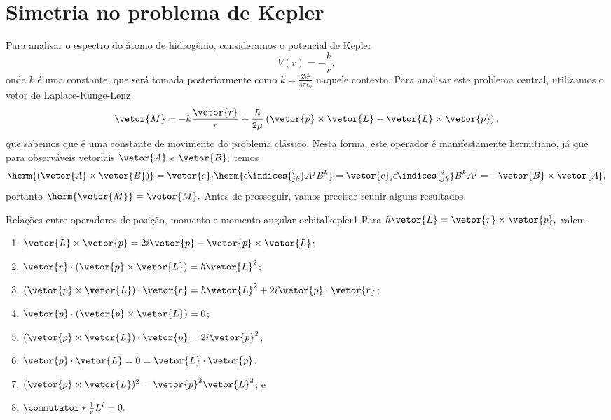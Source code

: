 \section{Simetria no problema de Kepler}
Para analisar o espectro do átomo de hidrogênio, consideramos o potencial de Kepler
\begin{equation*}
   V(r) = -\frac{k}{r},
\end{equation*}
onde \(k\) é uma constante, que será tomada posteriormente como \(k = \frac{Ze^2}{4\pi \epsilon_0}\) naquele contexto. Para analisar este problema central, utilizamos o vetor de Laplace-Runge-Lenz
\begin{equation*}
   \vetor{M} = -k \frac{\vetor{r}}{r} + \frac{\hbar}{2\mu}\left(\vetor{p}\times\vetor{L} - \vetor{L}\times\vetor{p}\right),
\end{equation*}
que sabemos que é uma constante de movimento do problema clássico. Nesta forma, este operador é manifestamente hermitiano, já que para observáveis vetoriais \(\vetor{A}\) e \(\vetor{B},\) temos
\begin{equation*}
   \herm{(\vetor{A}\times\vetor{B})} = \vetor{e}_i\herm{\epsilon\indices{^i_{jk}}A^j B^k} = \vetor{e}_i  \epsilon\indices{^i_{jk}} B^k A^j = - \vetor{B} \times \vetor{A},
\end{equation*}
portanto \(\herm{\vetor{M}} = \vetor{M}.\) Antes de prosseguir, vamos precisar reunir alguns resultados.
\begin{lemma}{Relações entre operadores de posição, momento e momento angular orbital}{kepler1}
   Para \(\hbar\vetor{L} = \vetor{r} \times \vetor{p},\) valem
   \begin{enumerate}[label=(\alph*)]
      \item \(\vetor{L}\times \vetor{p} = 2i\vetor{p} -\vetor{p}\times \vetor{L}\);
      \item \(\vetor{r} \cdot (\vetor{p} \times \vetor{L}) = \hbar \vetor{L}^2\);
      \item \((\vetor{p} \times \vetor{L}) \cdot \vetor{r} = \hbar \vetor{L}^2 + 2i \vetor{p} \cdot \vetor{r}\);
      \item \(\vetor{p}\cdot(\vetor{p}\times\vetor{L}) = 0\);
      \item \((\vetor{p}\times \vetor{L})\cdot \vetor{p} = 2i \vetor{p}^2\);
      \item \(\vetor{p} \cdot \vetor{L} = 0 = \vetor{L}\cdot\vetor{p}\); 
      \item \((\vetor{p}\times\vetor{L})^2 = \vetor{p}^2 \vetor{L}^2\); e
      \item \(\commutator*{\frac{1}{r}}{L^i} = 0.\)
   \end{enumerate}
\end{lemma}
